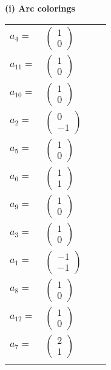 \documentclass[1p]{elsarticle_modified}
\theoremstyle{definition}
\begin{document}
\flushleft \textbf{(i) Arc colorings}\\
\begin{tabular}{m{7pt} m{180pt} m{7pt} m{180pt} }
\flushright $a_{4}=$&$\begin{pmatrix}1\\0\end{pmatrix}$ \\
\flushright $a_{11}=$&$\begin{pmatrix}1\\0\end{pmatrix}$ \\
\flushright $a_{10}=$&$\begin{pmatrix}1\\0\end{pmatrix}$ \\
\flushright $a_{2}=$&$\begin{pmatrix}0\\-1\end{pmatrix}$ \\
\flushright $a_{5}=$&$\begin{pmatrix}1\\0\end{pmatrix}$ \\
\flushright $a_{6}=$&$\begin{pmatrix}1\\1\end{pmatrix}$ \\
\flushright $a_{9}=$&$\begin{pmatrix}1\\0\end{pmatrix}$ \\
\flushright $a_{3}=$&$\begin{pmatrix}1\\0\end{pmatrix}$ \\
\flushright $a_{1}=$&$\begin{pmatrix}-1\\-1\end{pmatrix}$ \\
\flushright $a_{8}=$&$\begin{pmatrix}1\\0\end{pmatrix}$ \\
\flushright $a_{12}=$&$\begin{pmatrix}1\\0\end{pmatrix}$ \\
\flushright $a_{7}=$&$\begin{pmatrix}2\\1\end{pmatrix}$\\&\end{tabular}
\end{document}
